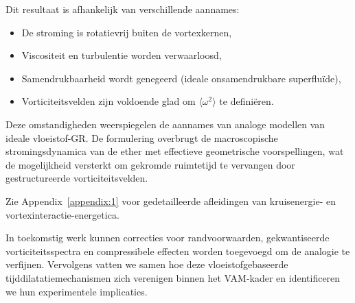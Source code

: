 Dit resultaat is afhankelijk van verschillende aannames:
\begin{itemize}
\item De stroming is rotatievrij buiten de vortexkernen,
\item Viscositeit en turbulentie worden verwaarloosd,
\item Samendrukbaarheid wordt genegeerd (ideale onsamendrukbare superfluïde),
\item Vorticiteitsvelden zijn voldoende glad om $\langle \omega^2 \rangle$ te definiëren.
\end{itemize}

Deze omstandigheden weerspiegelen de aannames van analoge modellen van ideale vloeistof-GR. De formulering overbrugt de macroscopische stromingsdynamica van de ether met effectieve geometrische voorspellingen, wat de mogelijkheid versterkt om gekromde ruimtetijd te vervangen door gestructureerde vorticiteitsvelden.

Zie Appendix~\ref{appendix:1} voor gedetailleerde afleidingen van kruisenergie- en vortexinteractie-energetica.

In toekomstig werk kunnen correcties voor randvoorwaarden, gekwantiseerde vorticiteitsspectra en compressibele effecten worden toegevoegd om de analogie te verfijnen. Vervolgens vatten we samen hoe deze vloeistofgebaseerde tijddilatatiemechanismen zich verenigen binnen het VAM-kader en identificeren we hun experimentele implicaties.